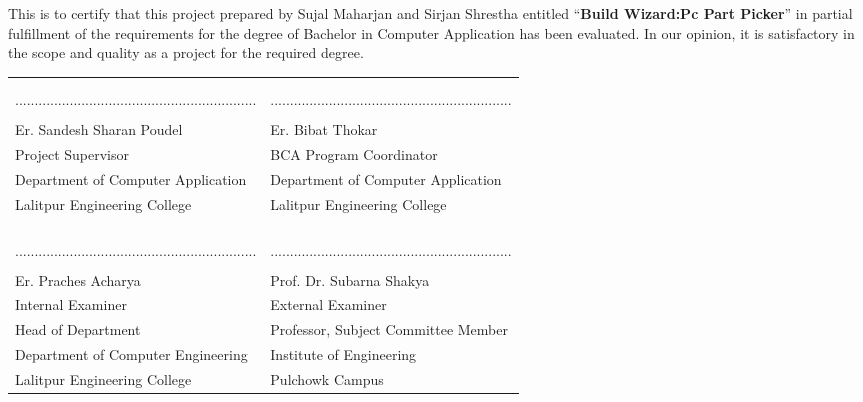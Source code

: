 This is to certify that this project prepared by Sujal Maharjan and Sirjan Shrestha entitled “\textbf{Build Wizard:Pc Part Picker}” in partial fulfillment of the requirements for the degree of Bachelor in Computer Application has been evaluated. In our opinion, it is satisfactory in the scope and quality as a project for the required degree.
\begin{center}
    {\fontsize{14pt}{18}\selectfont
    \begin{table}[ht]
        \begin{tabularx}{\textwidth}{|Y|Y|}
        \hline
        &\\
        &\\
        ..............................................................&..............................................................\\
        &\\
        Er. Sandesh Sharan Poudel & Er. Bibat Thokar \\
        Project Supervisor & BCA Program Coordinator \\
        Department of Computer Application & Department of Computer Application\\
        Lalitpur Engineering College & Lalitpur Engineering College \\
        &\\
        &\\
        \hline
        &\\
        &\\
        .............................................................. & ..............................................................\\
        &\\
        Er. Praches Acharya & Prof. Dr. Subarna Shakya\\
        Internal Examiner&External Examiner\\
        Head of Department & Professor, Subject Committee Member\\
        Department of Computer Engineering & Institute of Engineering \\
        Lalitpur Engineering College & Pulchowk Campus \\
        \hline
        \end{tabularx}
        \end{table}
    }
\end{center}